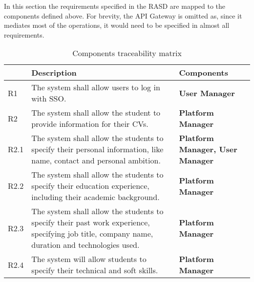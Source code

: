 In this section the requirements specified in the RASD are mapped to the components defined above. For brevity,
the API Gateway is omitted as, since it mediates most of the operations, it would need to be specified in almost
all requirements.
\begin{center}
    \begin{longtable}{|l|p{8cm}|p{5cm}|}
        \hline
              & \textbf{Description}                                                                                                                                                           & \textbf{Components}                                                        \\\hline
        \hline
        \endhead
        \hline
        \endfoot
        \hline
        \caption{Components traceability matrix}
        \label{table:Components traceability matrix}
        \endlastfoot
        R1    & The system shall allow users to log in with SSO.                                                                                                                               & \textbf{User Manager}                                                      \\\hline
        R2    & The system shall allow the student to provide information for their CVs.                                                                                                                    & \textbf{Platform Manager}                                                  \\\hline
        R2.1  &  The system shall allow the students to specify their personal information,
like name, contact and personal ambition.                                                                                      & \textbf{Platform Manager, User Manager}                                                  \\\hline
        R2.2  & The system shall allow the students to specify their education experience,
including their academic background.                                    & \textbf{Platform Manager}                                  
\\\hline
        R2.3  & The system shall allow the students to specify their past work experience,
specifying job title, company name, duration and technologies used.                                                                                                                    & \textbf{Platform Manager}                            \\\hline
        R2.4  & The system will allow students to specify their technical and soft skills.                                                                                                     & \textbf{Platform Manager}                    \\\hline

\end{longtable}
\end{center}
